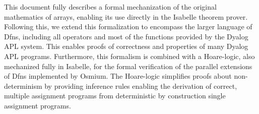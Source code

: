 This document fully describes a formal mechanization of the original 
mathematics of arrays, enabling its use directly in the Isabelle 
theorem prover. Following this, we extend this formalization to encompass
the larger language of Dfns, including all operators and most of the 
functions provided by the Dyalog APL system. This enables proofs of 
correctness and properties of many Dyalog APL programs. Furthermore, 
this formalism is combined with a Hoare-logic, also mechanized fully 
in Isabelle, for the formal verification of the parallel extensions 
of Dfns implemented by Osmium. The Hoare-logic simplifies proofs about 
non-determinism by providing inference rules enabling the derivation 
of correct, multiple assignment programs from deterministic by construction 
single assignment programs.




